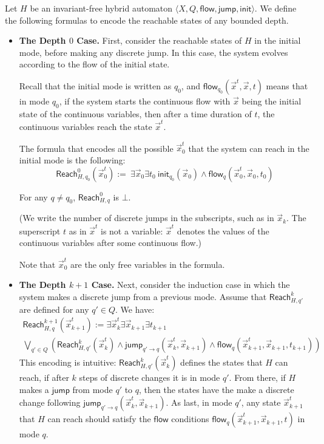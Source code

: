 \documentclass[envcountsect]{llncs}
\newcommand{\flow}{\mathsf{flow}}
\newcommand{\jump}{\mathsf{jump}}
\newcommand{\init}{\mathsf{init}}
\newcommand{\reach}{\mathsf{Reach}}
\begin{document}
\begin{definition}[$\reach_H^n(\vec x)$, Invariant-Free Case]

Let $H$ be an invariant-free hybrid automaton $\langle X, Q, \flow,
\jump,\init\rangle$. We define the following formulas to encode the reachable
states of any bounded depth.  

\begin{itemize}
\item {\bf The Depth $0$ Case.} First, consider the reachable states of $H$ in
the initial mode, before making any discrete jump. In this case, the system
evolves according to the flow of the initial state. 

Recall that the initial mode is written as $q_0$, and $\flow_{q_0}(\vec x^t,
\vec x, t)$ means that in mode $q_0$, if the system starts the continuous flow
with $\vec x$ being the initial state of the continuous variables, then after a
time duration of $t$, the continuous variables reach the state $\vec x^t$. 

The formula that encodes all the possible $\vec x_0^t$ that the system can
reach in the initial mode is the following:
\[
\reach^0_{H,q_0} (\vec x_0^t):=\ \exists \vec x_0 \exists t_0\ \init_{q_0}(\vec
x_0)\wedge \flow_q(\vec x_0^t, \vec x_0, t_0)
\]

For any $q\neq q_0$, $\reach^0_{H,q}$ is $\bot$. 

(We write the number of discrete jumps in the subscripts, such as in $\vec
x_k$. The superscript $t$ as in $\vec x^t$ is not a variable: $\vec x^t$ denotes
the values of the continuous variables after some continuous flow.)


Note that $\vec x_0^t$ are the only free variables in the formula. 



\item {\bf The Depth $k+1$ Case.} Next, consider the induction case in which
the system makes a discrete jump from a previous mode. Assume that
$\reach^k_{H,q'}$ are defined for any $q'\in Q$. We have:
\begin{multline*}
\reach^{k+1}_{H,q}(\vec x_{k+1}^t):=  \exists \vec x_k^t\exists \vec
x_{k+1}\exists t_{k+1}\ \\
\bigvee_{q'\in Q} (\reach^k_{H,q'} (\vec x_k^t) \wedge \jump_{q'\rightarrow
q}(\vec x_k^t, \vec x_{k+1}) \wedge \flow_{q}(\vec x_{k+1}^t, \vec x_{k+1},
t_{k+1}))
\end{multline*}
This encoding is intuitive: $\reach_{H,q'}^k(\vec x_k^t)$ defines the states
that $H$ can reach, if after $k$ steps of discrete changes it is in mode $q'$.
From there, if $H$ makes a $\jump$ from mode $q'$ to $q$, then the states have
the make a discrete change following $\jump_{q'\rightarrow q}(\vec x_k^t, \vec
x_{k+1})$. As last, in mode $q'$, any state $\vec x_{k+1}^t$ that $H$ can reach
should satisfy the $\flow$ conditions $\flow_q(\vec x_{k+1}^t, \vec x_{k+1}, t)$
in mode $q$.


\end{itemize}
\end{definition}
\end{document}
